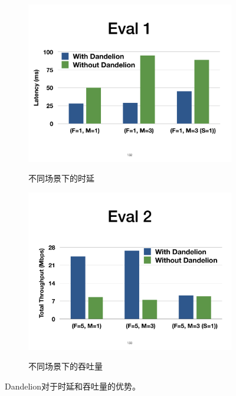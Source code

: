 \begin{figure}[!htbp]
\centering

  \begin{subfigure}[b]{0.65\linewidth}
      \includegraphics[width=\linewidth]{figures/ss-eval1.pdf}
      \label{fig:eval1}
      \caption{不同场景下的时延}
  \end{subfigure}


  \vspace{0.5cm}
  \begin{subfigure}[b]{0.65\linewidth}
      \includegraphics[width=\linewidth]{figures/ss-eval2.pdf}
      \label{fig:eval2}
      \caption{不同场景下的吞吐量}
  \end{subfigure}

\caption{Dandelion对于时延和吞吐量的优势。}
\label{fig:eval12}
\end{figure}




